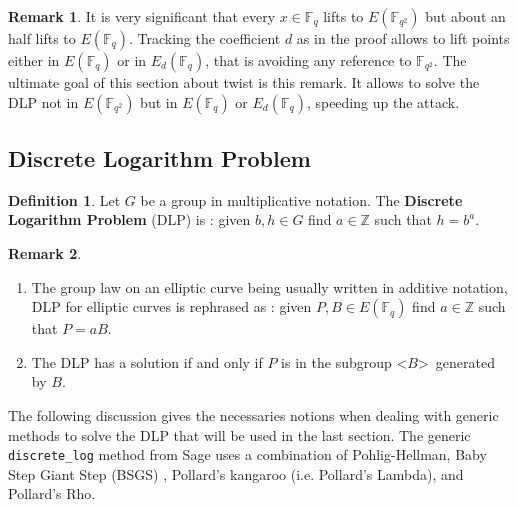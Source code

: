 \documentclass[10pt]{article}
\theoremstyle{definition}
\newtheorem{definition}{Definition}
\newtheorem{remark}{Remark}
\newcommand{\F}{\mathbb{F}}
\newcommand{\Z}{\mathbb{Z}}
\begin{document}
\begin{remark}
It is very significant that every $x \in \F_q$ lifts to $E(\F_{q^2})$ but about an half lifts to $E(\F_q)$.
Tracking the coefficient $d$ as in the proof allows to lift points either in $E(\F_q)$ or in $E_d(\F_q)$, that is avoiding any reference to $\F_{q^2}$.
The ultimate goal of this section about twist is this remark.
It allows to solve the DLP not in $E(\F_{q^2})$ but in $E(\F_q)$ or $E_d(\F_q)$, speeding up the attack.
\end{remark}

\subsection{Discrete Logarithm Problem}

\begin{definition}
Let $G$ be a group in multiplicative notation.
The \textbf{Discrete Logarithm Problem} (DLP) is : given $b,h \in G$ find $a \in \Z$ such that $h = b^a$.
\end{definition}

\noindent \begin{remark}
\begin{enumerate}
\item The group law on an elliptic curve being usually written in additive notation, DLP for elliptic curves is rephrased as : given $P,B \in E(\F_q)$ find $a \in \Z$ such that $P = aB$.
\item The DLP has a solution if and only if $P$ is in the subgroup \textless$B$\textgreater~generated by $B$.
\end{enumerate}
\end{remark}

The following discussion gives the necessaries notions when dealing with generic methods to solve the DLP that will be used in the last section.
The generic \verb|discrete_log| method from Sage uses a combination of Pohlig-Hellman, Baby Step Giant Step (BSGS) , Pollard’s kangaroo (i.e. Pollard's Lambda), and Pollard’s Rho. 
\end{document}
